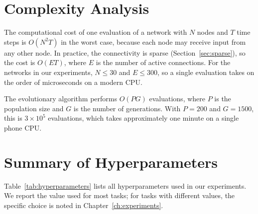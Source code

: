 \section{Complexity Analysis}
\label{sec:complexity}

The computational cost of one evaluation of a network with $N$ nodes
and $T$ time steps is $O(N^2 T)$ in the worst case, because each node
may receive input from any other node. In practice, the connectivity
is sparse (Section~\ref{sec:sparse}), so the cost is $O(E T)$, where
$E$ is the number of active connections. For the networks in our
experiments, $N \leq 30$ and $E \leq 300$, so a single evaluation
takes on the order of microseconds on a modern CPU.

The evolutionary algorithm performs $O(P G)$ evaluations, where $P$
is the population size and $G$ is the number of generations. With
$P = 200$ and $G = 1500$, this is $3 \times 10^5$ evaluations, which
takes approximately one minute on a single phone CPU.

\section{Summary of Hyperparameters}
\label{sec:hyperparameters}

Table~\ref{tab:hyperparameters} lists all hyperparameters used in our
experiments. We report the value used for most tasks; for tasks with
different values, the specific choice is noted in
Chapter~\ref{ch:experiments}.

